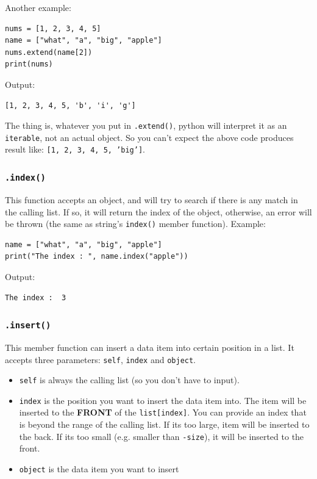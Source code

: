 \documentclass[12pt]{book}
\begin{document}
Another example:
\begin{verbatim}
nums = [1, 2, 3, 4, 5]
name = ["what", "a", "big", "apple"]
nums.extend(name[2])
print(nums)
\end{verbatim}
Output:
\begin{verbatim}
[1, 2, 3, 4, 5, 'b', 'i', 'g']
\end{verbatim}
The thing is, whatever you put in \texttt{.extend()}, python will interpret it as an \texttt{iterable}, not an actual object. So you can't expect the above code produces result like: \texttt{[1, 2, 3, 4, 5, 'big']}.
\subsubsection{\texttt{.index()}}
\label{sec:orgff8f01e}
This function accepts an object, and will try to search if there is any match in the calling list. If so, it will return the index of the object, otherwise, an error will be thrown (the same as string's \texttt{index()} member function). Example:
\begin{verbatim}
name = ["what", "a", "big", "apple"]
print("The index : ", name.index("apple"))
\end{verbatim}
Output:
\begin{verbatim}
The index :  3
\end{verbatim}
\subsubsection{\texttt{.insert()}}
\label{sec:org6979827}
This member function can insert a data item into certain position in a list. It accepts three parameters: \texttt{self}, \texttt{index} and \texttt{object}.
\begin{itemize}
\item \texttt{self} is always the calling list (so you don't have to input).
\item \texttt{index} is the position you want to insert the data item into. The item will be inserted to the \textbf{FRONT} of the \texttt{list[index]}. You can provide an index that is beyond the range of the calling list. If its too large, item will be inserted to the back. If its too small (e.g. smaller than \texttt{-size}), it will be inserted to the front.
\item \texttt{object} is the data item you want to insert
\end{itemize}
\end{document}
